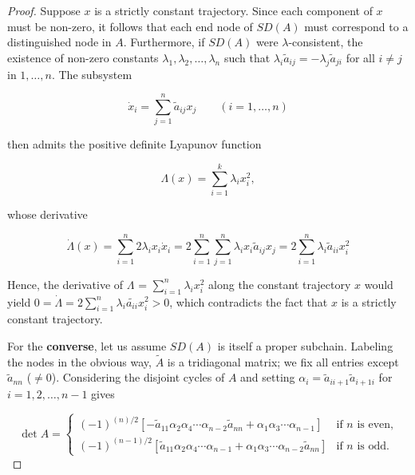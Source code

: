 \begin{proof}
	Suppose $x$ is a strictly constant trajectory. Since each component of $x$ must be non-zero, it follows that each end node of $SD(A)$ must correspond to a distinguished node in $A$. Furthermore, if $SD(A)$ were $\lambda$-consistent, the existence of non-zero constants $\lambda_1, \lambda_2, \ldots, \lambda_n$ such that $\lambda_i\tilde{a}_{ij} = -\lambda_j\tilde{a}_{ji}$ for all $i \neq j$ in ${1, \ldots, n}$. The subsystem
	
	\begin{equation}
		\dot{x}_i = \sum_{j=1}^n \tilde{a}_{ij}x_j \qquad (i = 1, \ldots, n)
	\end{equation}
	
	then admits the positive definite Lyapunov function
	
	\begin{equation}
		\Lambda(x) = \sum_{i=1}^k \lambda_ix_i^2,
	\end{equation}
	
	whose derivative
	
	
	$$\dot{\Lambda}(x) = \sum_{i=1}^n 2\lambda_ix_i\dot{x}_i = 2 \sum_{i=1}^n \sum_{j=1}^n \lambda_ix_i\tilde{a}_{ij}x_j = 2 \sum_{i=1}^n \lambda_i\tilde{a}_{ii}x_i^2 $$

	Hence, the derivative of $\Lambda$ = $\sum_{i=1}^n \lambda_i x_i^2$ along the constant trajectory $x$ would yield $ 0 = \dot{\Lambda} = 2\sum_{i=1}^n \lambda_i \tilde{a_{ii}}x_i^2 > 0$,  which contradicts the fact that $x$ is a strictly constant trajectory.
	
	For the \textbf{converse}, let us assume $SD(A)$ is itself a proper subchain. Labeling the nodes in the obvious way, $\tilde{A}$ is a tridiagonal matrix; we fix all entries except $\tilde{a}_{nn}$ ($\neq 0$). Considering the disjoint cycles of $A$ and setting $\alpha_i =\tilde{a}_{ii+1}\tilde{a}_{i+1i}$ for $i = 1,2,\ldots,n-1$ gives
	
	\begin{equation}
		\det A = \begin{cases}
			(-1)^{(n)/2}[-\tilde{a}_{11}\alpha_2\alpha_4\cdots\alpha_{n-2}\tilde{a}_{nn} + \alpha_1\alpha_3\cdots\alpha_{n-1}] & \text{if $n$ is even,} \\
			(-1)^{(n-1)/2}[\tilde{a}_{11} \alpha_2\alpha_4\cdots\alpha_{n-1} + \alpha_1\alpha_3\cdots\alpha_{n-2}\tilde{a}_{nn}] & \text{if $n$ is odd.}
		\end{cases}
	\end{equation}
	

\end{proof}
